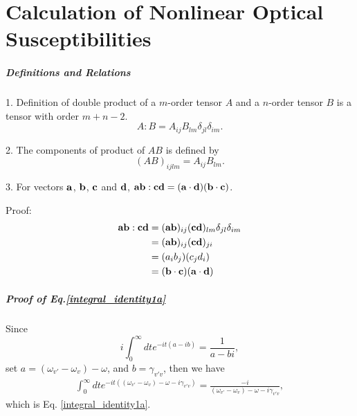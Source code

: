 \chapter{Calculation of Nonlinear Optical Susceptibilities}\label{calculation_of_chi}

\paragraph{Definitions and Relations}

1. Definition of double product of a $m$-order tensor $A$ and a $n$-order tensor $B$ is a tensor with order $m+n-2$.
\begin{equation}
    A:B=A_{ij}B_{lm}\delta_{jl}\delta_{im}.
\label{tensor_double_product}
\end{equation}

2. The components of product of $AB$ is defined by 
\begin{equation}
    (AB)_{ijlm}=A_{ij}B_{lm}.
\label{tensor_product}
\end{equation}

3. For vectors $\bf{a}$, $\bf{b}$, $\bf{c}$ and $\bf{d}$, ${\bf{ab}}:{\bf{cd}}=({\bf{a}}\cdot {\bf{d}})({\bf{b}}\cdot{\bf{c}})$.

Proof:
\begin{align}
    {\bf{ab}}:{\bf{cd}}&=({\bf{ab}})_{ij}({\bf{cd}})_{lm}\delta_{jl}\delta_{im} \nonumber \\
    &=({\bf{ab}})_{ij}({\bf{cd}})_{ji} \nonumber\\
    &=(a_i b_j)(c_j d_i) \nonumber\\
    &=({\bf{b}}\cdot{\bf{c}})({\bf{a}}\cdot{\bf{d}})
\end{align}

\paragraph{Proof of Eq.\space\ref{integral_identity1a}}
Since 
\begin{equation}
  i\int_0^\infty dt e^{-it(a-ib)}=\frac{1}{a-bi},
  \label{integral_identity1}
\end{equation}
set $a = (\omega_{v'} - \omega_{v}) - \omega$, and $b = \gamma_{v'v}$,
then we have
 \begin{align}
 \int_0^\infty dt e^{-it((\omega_{v'}-\omega_v)-\omega-i\gamma_{v'v})}=\frac{-i}{(\omega_{v'} -\omega_v)-\omega-i\gamma_{v'v}},\nonumber
 \end{align}
which is Eq. \ref{integral_identity1a}.

